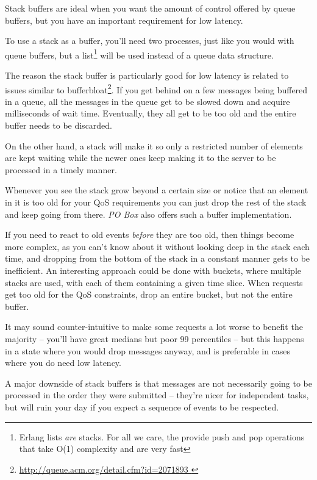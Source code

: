 \documentclass[11pt, oneside]{book}   	%
\begin{document}
Stack buffers are ideal when you want the amount of control offered by queue buffers, but you have an important requirement for low latency.

To use a stack as a buffer, you'll need two processes, just like you would with queue buffers, but a list\footnote{Erlang lists \emph{are} stacks. For all we care, the provide push and pop operations that take O(1) complexity and are very fast} will be used instead of a queue data structure.

The reason the stack buffer is particularly good for low latency is related to issues similar to bufferbloat\footnote{\href{http://queue.acm.org/detail.cfm?id=2071893}{http://queue.acm.org/detail.cfm?id=2071893 }}. If you get behind on a few messages being buffered in a queue, all the messages in the queue get to be slowed down and acquire milliseconds of wait time. Eventually, they all get to be too old and the entire buffer needs to be discarded.


On the other hand, a stack will make it so only a restricted number of elements are kept waiting while the newer ones keep making it to the server to be processed in a timely manner.


Whenever you see the stack grow beyond a certain size or notice that an element in it is too old for your QoS requirements you can just drop the rest of the stack and keep going from there. \emph{PO Box} also offers such a buffer implementation.

If you need to react to old events \emph{before} they are too old, then things become more complex, as you can't know about it without looking deep in the stack each time, and dropping from the bottom of the stack in a constant manner gets to be inefficient. An interesting approach could be done with buckets, where multiple stacks are used, with each of them containing a given time slice. When requests get too old for the QoS constraints, drop an entire bucket, but not the entire buffer.

It may sound counter-intuitive to make some requests a lot worse to benefit the majority -- you'll have great medians but poor 99 percentiles -- but this happens in a state where you would drop messages anyway, and is preferable in cases where you do need low latency. 

A major downside of stack buffers is that messages are not necessarily going to be processed in the order they were submitted -- they're nicer for independent tasks, but will ruin your day if you expect a sequence of events to be respected.
\end{document}

